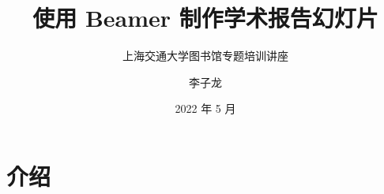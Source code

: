 \documentclass{ctexbeamer}
\begin{document}
    \title{使用 Beamer 制作学术报告幻灯片}
    \subtitle{上海交通大学图书馆专题培训讲座}
    \author{李子龙}
    \date{2022 年 5 月}
    \maketitle
    \part{介绍}
    \makebottom
\end{document}

